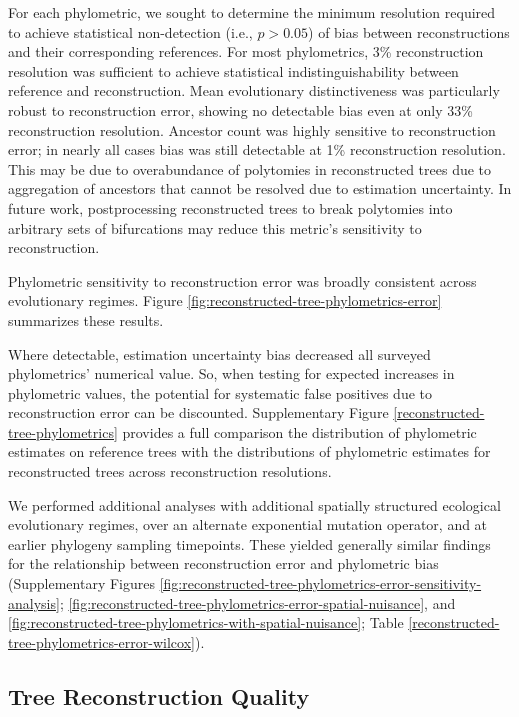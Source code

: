 

For each phylometric, we sought to determine the minimum resolution required to achieve statistical non-detection (i.e., $p > 0.05$) of bias between reconstructions and their corresponding references. 
For most phylometrics, 3\% reconstruction resolution was sufficient to achieve statistical indistinguishability between reference and reconstruction.
Mean evolutionary distinctiveness was particularly robust to reconstruction error, showing no detectable bias even at only 33\% reconstruction resolution. 
Ancestor count was highly sensitive to reconstruction error; in nearly all cases bias was still detectable at 1\% reconstruction resolution.
This may be due to overabundance of polytomies in reconstructed trees due to aggregation of ancestors that cannot be resolved due to estimation uncertainty.
In future work, postprocessing reconstructed trees to break polytomies into arbitrary sets of bifurcations may reduce this metric's sensitivity to reconstruction.

Phylometric sensitivity to reconstruction error was broadly consistent across evolutionary regimes.
Figure \ref{fig:reconstructed-tree-phylometrics-error} summarizes these results.

Where detectable, estimation uncertainty bias decreased all surveyed phylometrics' numerical value.
So, when testing for expected increases in phylometric values, the potential for systematic false positives due to reconstruction error can be discounted. 
Supplementary Figure \ref{reconstructed-tree-phylometrics} provides a full comparison the distribution of phylometric estimates on reference trees with the distributions of phylometric estimates for reconstructed trees across reconstruction resolutions.

We performed additional analyses with additional spatially structured ecological evolutionary regimes, over an alternate exponential mutation operator, and at earlier phylogeny sampling timepoints.
These yielded generally similar findings for the relationship between reconstruction error and phylometric bias (Supplementary Figures \ref{fig:reconstructed-tree-phylometrics-error-sensitivity-analysis}; \ref{fig:reconstructed-tree-phylometrics-error-spatial-nuisance}, and \ref{fig:reconstructed-tree-phylometrics-with-spatial-nuisance};  Table \ref{reconstructed-tree-phylometrics-error-wilcox}).

\subsection{Tree Reconstruction Quality}

